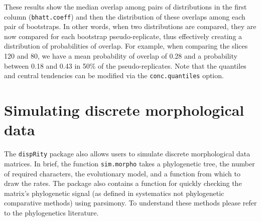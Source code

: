 \documentclass[]{book}
\newenvironment{Shaded}{\begin{snugshade}}{\end{snugshade}}
\newcommand{\KeywordTok}[1]{\textcolor[rgb]{0.13,0.29,0.53}{\textbf{#1}}}
\newcommand{\DataTypeTok}[1]{\textcolor[rgb]{0.13,0.29,0.53}{#1}}
\newcommand{\DecValTok}[1]{\textcolor[rgb]{0.00,0.00,0.81}{#1}}
\newcommand{\FloatTok}[1]{\textcolor[rgb]{0.00,0.00,0.81}{#1}}
\newcommand{\StringTok}[1]{\textcolor[rgb]{0.31,0.60,0.02}{#1}}
\newcommand{\OtherTok}[1]{\textcolor[rgb]{0.56,0.35,0.01}{#1}}
\newcommand{\OperatorTok}[1]{\textcolor[rgb]{0.81,0.36,0.00}{\textbf{#1}}}
\newcommand{\NormalTok}[1]{#1}
\theoremstyle{definition}
\theoremstyle{definition}
\theoremstyle{remark}
\begin{document}
These results show the median overlap among pairs of distributions in
the first column (\texttt{bhatt.coeff}) and then the distribution of
these overlaps among each pair of bootstraps. In other words, when two
distributions are compared, they are now compared for each bootstrap
pseudo-replicate, thus effectively creating a distribution of
probabilities of overlap. For example, when comparing the slices 120 and
80, we have a mean probability of overlap of 0.28 and a probability
between 0.18 and 0.43 in 50\% of the pseudo-replicates. Note that the
quantiles and central tendencies can be modified via the
\texttt{conc.quantiles} option.

\section{Simulating discrete morphological
data}\label{simulating-discrete-morphological-data}

The \texttt{dispRity} package also allows users to simulate discrete
morphological data matrices. In brief, the function \texttt{sim.morpho}
takes a phylogenetic tree, the number of required characters, the
evolutionary model, and a function from which to draw the rates. The
package also contains a function for quickly checking the matrix's
phylogenetic signal (as defined in systematics not phylogenetic
comparative methods) using parsimony. To understand these methods please
refer to the phylogenetics literature.

\begin{Shaded}
\end{Shaded}
\end{document}
